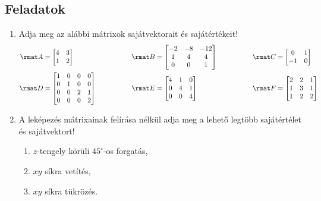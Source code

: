 \documentclass[a4paper, 12pt]{scrartcl}
\begin{document}
\subsection{Feladatok}
\begin{enumerate}
  \item Adja meg az alábbi mátrixok sajátvektorait és sajátértékeit!
        \begin{alignat*}{9}
          \rmat A & =
          \begin{bmatrix}
            4 & 3 \\
            1 & 2
          \end{bmatrix}
                  & \rmat B & =
          \begin{bmatrix}
            -2 & -8 & -12 \\
            1  & 4  & 4   \\
            0  & 0  & 1
          \end{bmatrix}
          \hspace{15mm}
                  & \rmat C & =
          \begin{bmatrix}
            0  & 1 \\
            -1 & 0
          \end{bmatrix}
          \\
          \rmat D & =
          \begin{bmatrix}
            1 & 0 & 0 & 0 \\
            0 & 1 & 0 & 0 \\
            0 & 0 & 2 & 1 \\
            0 & 0 & 0 & 2
          \end{bmatrix}
          \hspace{15mm}
                  & \rmat E & =
          \begin{bmatrix}
            4 & 1 & 0 \\
            0 & 4 & 1 \\
            0 & 0 & 4
          \end{bmatrix}
                  & \rmat F & =
          \begin{bmatrix}
            2 & 2 & 1 \\
            1 & 3 & 1 \\
            1 & 2 & 2
          \end{bmatrix}
        \end{alignat*}

  \item A leképezés mátrixainak felírása nélkül adja meg a lehető legtöbb
        sajátértélet és sajátvektort!
        \begin{enumerate}
          \item $z$-tengely körüli $45^\circ$-os forgatás,
          \item $xy$ síkra vetítés,
          \item $xy$ síkra tükrözés.
        \end{enumerate}


\end{enumerate}
\end{document}
